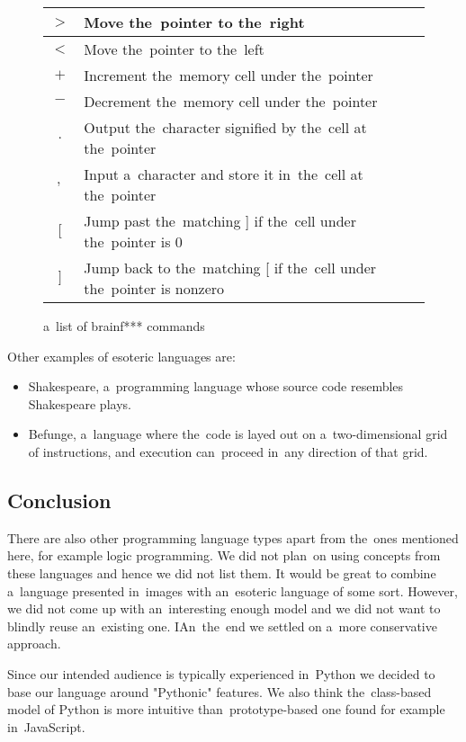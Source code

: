 \begin{figure}[!hbt]
    \centering
    \begin{tabular}{|c l |} 
    \hline
    $>$ & Move the~pointer to the~right \\
    \hline
    $<$ & Move the~pointer to the~left \\
    \hline
    $+$ & Increment the~memory cell under the~pointer \\
    \hline
    $-$ & Decrement the~memory cell under the~pointer \\
    \hline
    $.$ & Output the~character signified by the~cell at the~pointer \\
    \hline
    $,$ & Input a~character and store it in~the~cell at the~pointer \\
    \hline
    $[$ & Jump past the~matching ] if the~cell under the~pointer is 0 \\
    \hline
    $]$ & Jump back to the~matching [ if the~cell under the~pointer is nonzero \\
    \hline
    \end{tabular}
    \caption{a~list of brainf*** commands}
\end{figure}

Other examples of esoteric languages are:
\begin{itemize}
    \item Shakespeare, a~programming language whose source code resembles Shakespeare plays. 
    \item Befunge, a~language where the~code is layed out on a~two-dimensional grid of instructions, and execution can~proceed in~any direction of that grid.
\end{itemize}

\subsection{Conclusion}
There are also other programming language types apart from the~ones mentioned here, for example logic programming. We did not plan~on using
concepts from these languages and hence we did not list them. It would be great to combine a~language presented in~images with an~esoteric language
of some sort. However, we did not come up with an~interesting enough model and we did not want to blindly reuse an~existing one. IAn~the~end we settled on
a~more conservative approach.

Since our intended audience is typically experienced in~Python we decided to base our language around "Pythonic" features. We also think
the~class-based model of Python is more intuitive than~prototype-based one found for example in~JavaScript.

